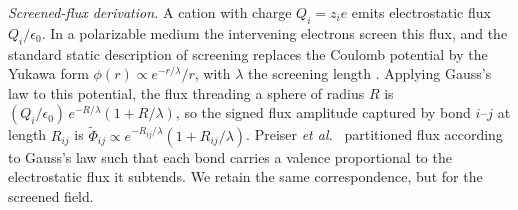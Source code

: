 \documentclass[aps,prmaterials,twocolumn,10pt,superscriptaddress,floatfix]{revtex4-2}
\newcommand{\runinsec}[1]{\medskip\emph{#1}}
\begin{document}
\runinsec{Screened-flux derivation.} A cation with charge $Q_i=z_i e$ emits
electrostatic flux $Q_i/\epsilon_0$.  In a polarizable medium the
intervening electrons screen this flux, and the standard static
description of screening replaces the Coulomb potential by the Yukawa
form $\phi(r)\propto e^{-r/\lambda}/r$, with $\lambda$ the screening
length \cite{Debye1923,Thomas1927,Fermi1928,Yukawa1935}.  Applying
Gauss's law to this potential, the flux threading a sphere of radius
$R$ is $(Q_i/\epsilon_0)\,e^{-R/\lambda}(1+R/\lambda)$, so the signed
flux amplitude captured by bond $i$--$j$ at length $R_{ij}$ is
$\widetilde\Phi_{ij}\propto e^{-R_{ij}/\lambda}(1+R_{ij}/\lambda)$.
Preiser \emph{et al.}\ \cite{Preiser1999} partitioned flux according to
Gauss's law such that each bond carries a valence proportional to the
electrostatic flux it subtends.  We retain the same correspondence, but for
the screened field. 
\end{document}
